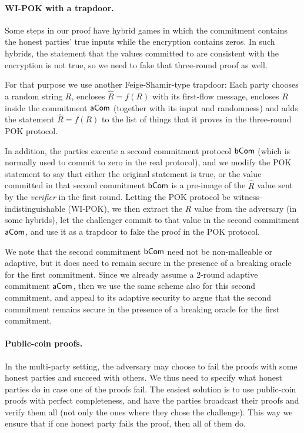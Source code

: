 \paragraph{WI-POK with a trapdoor.}
Some steps in our proof have hybrid games in which the commitment
contains the honest parties' true inputs while the encryption contains
zeros. In such hybrids, the statement that the values committed to are
consistent with the encryption is not true, so we need to fake that
three-round proof as well.

For that purpose we use another Feige-Shamir-type trapdoor: Each party
chooses a random string $R$, encloses $\hat{R}=f(R)$ with its first-flow
message, encloses $R$ inside the commitment $\mathsf{aCom}$ (together with its input
and randomness) and adds the statement $\hat{R}=f(R)$ to the list of things
that it proves in the three-round POK protocol.

In addition, the parties execute a second commitment protocol $\mathsf{bCom}$
(which is normally used to commit to zero in the real protocol), and
we modify the POK statement to say that either the original statement
is true, or the value committed in that second commitment $\mathsf{bCom}$ is a
pre-image of the $\hat{R}$ value sent by the \emph{verifier} in the
first round. Letting the POK protocol be witness-indistinguishable
(WI-POK), we then extract the $R$ value from the adversary (in some
hybrids), let the challenger commit to that value in the second
commitment $\mathsf{aCom}$, and use it as a trapdoor to fake the proof in the
POK protocol.

We note that the second commitment $\mathsf{bCom}$ need not be non-malleable
or adaptive, but it does need to remain secure in the presence of a
breaking oracle for the first commitment. Since we already assume a
2-round adaptive commitment $\mathsf{aCom}$, then we use the same scheme also
for this second commitment, and appeal to its adaptive security to
argue that the second commitment remains secure in the presence of a
breaking oracle for the first commitment.


\paragraph{Public-coin proofs.}
In the multi-party setting, the adversary may choose to fail the proofs with some honest parties and succeed with others. We thus need to specify what honest parties do in case one of the proofs fail. The easiest solution is to use public-coin proofs with perfect completeness, and have the parties broadcast their proofs and verify them all (not only the ones where they chose the challenge). This way we ensure that if one honest party fails the proof, then all of them do.

